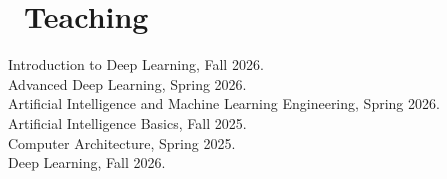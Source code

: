 \documentclass[a4paper,11pt]{article}
\begin{document}
\section{\texorpdfstring{\faBook\ Teaching}{Teaching}}
\noindent Introduction to Deep Learning, Fall 2026.\\
Advanced Deep Learning, Spring 2026.\\
Artificial Intelligence and Machine Learning Engineering, Spring 2026.\\
Artificial Intelligence Basics, Fall 2025.\\
Computer Architecture, Spring 2025.\\
Deep Learning, Fall 2026.
\end{document}
